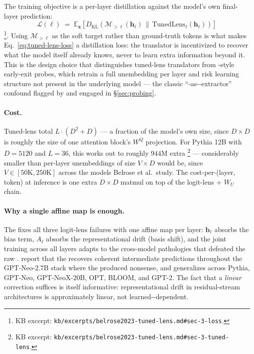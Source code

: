The training objective is a per-layer distillation against the model's
own final-layer prediction:
\begin{equation}
  \mathcal{L}(\ell)
  \;=\;
  \mathbb{E}_\mathbf{x}\!\left[D_{\mathrm{KL}}\!\left(\mathcal{M}_{>\ell}(\mathbf{h}_\ell)
  \,\big\|\,\mathrm{TunedLens}_\ell(\mathbf{h}_\ell)\right)\right]
  \label{eq:tuned-lens-loss}
\end{equation}
\citep[\S 3, Eq.~9]{belrose2023-tuned-lens}\footnote{KB excerpt:
\texttt{kb/excerpts/belrose2023-tuned-lens.md\#sec-3-loss}.}.
Using $\mathcal{M}_{>\ell}$ as the soft target rather than ground-truth
tokens is what makes Eq.~\eqref{eq:tuned-lens-loss} a distillation loss:
the translator is incentivized to recover what the model itself already
knows, never to learn extra information beyond it. This is the design
choice that distinguishes tuned-lens translators from
\citet{alain-bengio-2017}-style early-exit probes, which retrain a full
unembedding per layer and risk learning structure not present in the
underlying model — the classic ``-as--extractor'' confound
flagged by \citet{hewitt2019-control-tasks} and engaged in
\S\ref{sec:probing}.

\paragraph{Cost.} Tuned-lens  total $L \cdot (D^2 + D)$ — a
fraction of the model's own size, since $D \times D$ is roughly the
size of one attention block's $W^Q$ projection. For Pythia 12B with
$D = 5120$ and $L = 36$, this works out to roughly $944$M extra
 \citep[\S 3.2]{belrose2023-tuned-lens}\footnote{KB excerpt:
\texttt{kb/excerpts/belrose2023-tuned-lens.md\#sec-3-tuned-lens}.} ---
considerably smaller than per-layer unembeddings of size
$V \times D$ would be, since $V \in [50\text{K}, 250\text{K}]$ across
the models Belrose et al.\ study. The cost-per-(layer, token) at
inference is one extra $D \times D$ matmul on top of the logit-lens
 + $W_U$ chain.

\paragraph{Why a single affine map is enough.} The  fixes
all three logit-lens failures with one affine map per layer:
$\mathbf{b}_\ell$ absorbs the bias term, $A_\ell$ absorbs the
representational drift (basis shift), and the joint training across all
layers adapts to the cross-model pathologies that defeated the raw
. \citet[Fig.~1]{belrose2023-tuned-lens} report that the
 recovers coherent intermediate predictions throughout the
GPT-Neo-2.7B stack where the  produced nonsense, and
generalizes across Pythia, GPT-Neo, GPT-NeoX-20B, OPT, BLOOM, and
GPT-2. The fact that a \emph{linear} correction suffices is itself
informative: representational drift in residual-stream architectures is
approximately linear, not learned--dependent.

